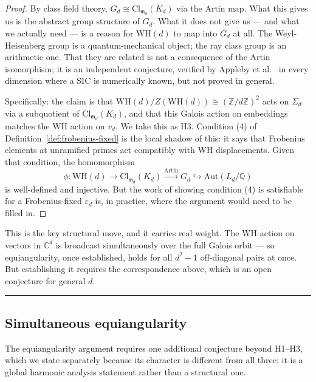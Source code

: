 \documentclass[12pt]{article}
\theoremstyle{plain}
\theoremstyle{definition}
\theoremstyle{remark}
\newcommand{\WH}{\mathrm{WH}}
\newcommand{\eps}{\varepsilon}
\newcommand{\bQ}{\mathbb{Q}}
\newcommand{\bC}{\mathbb{C}}
\newcommand{\bZ}{\mathbb{Z}}
\begin{document}
\begin{proof}
  By class field theory, $G_d \cong \mathrm{Cl}_{\mathfrak{m}_d}(K_d)$ via the Artin map. What this gives us is the abstract group structure of $G_d$. What it does not give us — and what we actually need — is a reason for $\WH(d)$ to map into $G_d$ at all. The Weyl-Heisenberg group is a quantum-mechanical object; the ray class group is an arithmetic one. That they are related is not a consequence of the Artin isomorphism; it is an independent conjecture, verified by Appleby et al.\ \cite{afmy2017} in every dimension where a SIC is numerically known, but not proved in general.

  Specifically: the claim is that $\WH(d)/Z(\WH(d)) \cong (\bZ/d\bZ)^2$ acts on $\Sigma_d$ via a subquotient of $\mathrm{Cl}_{\mathfrak{m}_d}(K_d)$, and that this Galois action on embeddings matches the WH action on $v_d$. We take this as H3. Condition (4) of Definition~\ref{def:frobenius-fixed} is the local shadow of this: it says that Frobenius elements at unramified primes act compatibly with WH displacements. Given that condition, the homomorphism
  \[
    \phi : \WH(d) \to \mathrm{Cl}_{\mathfrak{m}_d}(K_d) \xrightarrow{\mathrm{Artin}} G_d \hookrightarrow \mathrm{Aut}(L_d/\bQ)
  \]
  is well-defined and injective. But the work of showing condition (4) is satisfiable for a Frobenius-fixed $\eps_d$ is, in practice, where the argument would need to be filled in.
\end{proof}

This is the key structural move, and it carries real weight. The WH action on vectors in $\bC^d$ is broadcast simultaneously over the full Galois orbit — so equiangularity, once established, holds for all $d^2 - 1$ off-diagonal pairs at once. But establishing it requires the correspondence above, which is an open conjecture for general $d$.

\medskip\noindent\rule{\linewidth}{0.3pt}\medskip

\subsection{Simultaneous equiangularity}

The equiangularity argument requires one additional conjecture beyond H1--H3, which we state separately because its character is different from all three: it is a global harmonic analysis statement rather than a structural one.
\end{document}
